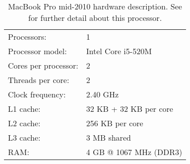 \begin{table}[!htp]
	\begin{center}
		\begin{tabular}{ll}
			\hline
			Processors: & 1	\\
			Processor model: & Intel{\textsuperscript{\textregistered}} Core{\textsuperscript{\texttrademark}} i5-520M\\
			Cores per processor: & 2	\\
			Threads per core: & 2	\\
			Clock frequency: & 2.40 GHz	\\
			\hline
			L1 cache: & 32 KB + 32 KB per core	\\
			L2 cache: & 256 KB per core	\\
			L3 cache: & 3 MB shared	\\
			RAM: & 4 GB	@ 1067 MHz (DDR3)\\
			\hline
		\end{tabular}
		\caption[MacBook Pro mid-2010 hardware description]{MacBook Pro mid-2010 hardware description. See \cite{i5-520m} for further detail about this processor.}
		\label{tab:mbp}
	\end{center}
\end{table}
